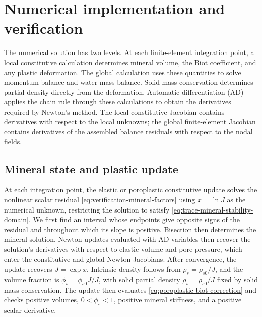 \section{Numerical implementation and verification}
\label{sec:implicit-ad-implementation}

The numerical solution has two levels.  At each finite-element integration
point, a local constitutive calculation determines mineral volume, the Biot
coefficient, and any plastic deformation.  The global calculation uses these
quantities to solve momentum balance and water mass balance.  Solid mass
conservation determines partial density directly from the deformation.
Automatic differentiation (AD) applies the chain rule through these
calculations to obtain the derivatives required by Newton's method.  The
local constitutive Jacobian contains derivatives with respect to the local
unknowns; the global finite-element Jacobian contains derivatives of the
assembled balance residuals with respect to the nodal fields.

\subsection{Mineral state and plastic update}

At each integration point, the elastic or poroplastic constitutive update
solves the nonlinear scalar residual
\eqref{eq:verification-mineral-factors} using
\(x=\ln\bar J\) as the numerical unknown, restricting the solution to satisfy
\eqref{eq:trace-mineral-stability-domain}.  We first find an interval whose
endpoints give opposite signs of the residual and throughout which its
slope is positive.  Bisection then determines the mineral solution.  Newton updates evaluated
with AD variables then recover the solution's derivatives with respect to
elastic volume and pore pressure, which enter the constitutive and global
Newton Jacobians.  After convergence,
the update recovers \(\bar J=\exp x\).  Intrinsic density follows from
\(\bar\rho_s=\bar\rho_{s0}/\bar J\), and the volume fraction is
\(\phi_s=\phi_{s0}\bar J/J\), with solid partial density
\(\rho_s=\rho_{s0}/J\) fixed by solid mass conservation.
The update then evaluates \eqref{eq:poroplastic-biot-correction} and checks
positive volumes, \(0<\phi_s<1\), positive mineral stiffness, and a positive
scalar derivative.

